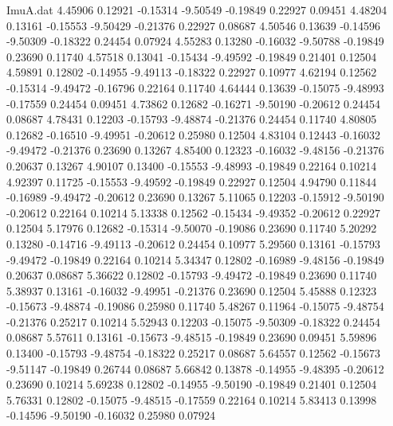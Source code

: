 \begin{filecontents}{ImuA.dat}
   4.45906    0.12921   -0.15314   -9.50549   -0.19849    0.22927    0.09451
   4.48204    0.13161   -0.15553   -9.50429   -0.21376    0.22927    0.08687
   4.50546    0.13639   -0.14596   -9.50309   -0.18322    0.24454    0.07924
   4.55283    0.13280   -0.16032   -9.50788   -0.19849    0.23690    0.11740
   4.57518    0.13041   -0.15434   -9.49592   -0.19849    0.21401    0.12504
   4.59891    0.12802   -0.14955   -9.49113   -0.18322    0.22927    0.10977
   4.62194    0.12562   -0.15314   -9.49472   -0.16796    0.22164    0.11740
   4.64444    0.13639   -0.15075   -9.48993   -0.17559    0.24454    0.09451
   4.73862    0.12682   -0.16271   -9.50190   -0.20612    0.24454    0.08687
   4.78431    0.12203   -0.15793   -9.48874   -0.21376    0.24454    0.11740
   4.80805    0.12682   -0.16510   -9.49951   -0.20612    0.25980    0.12504
   4.83104    0.12443   -0.16032   -9.49472   -0.21376    0.23690    0.13267
   4.85400    0.12323   -0.16032   -9.48156   -0.21376    0.20637    0.13267
   4.90107    0.13400   -0.15553   -9.48993   -0.19849    0.22164    0.10214
   4.92397    0.11725   -0.15553   -9.49592   -0.19849    0.22927    0.12504
   4.94790    0.11844   -0.16989   -9.49472   -0.20612    0.23690    0.13267
   5.11065    0.12203   -0.15912   -9.50190   -0.20612    0.22164    0.10214
   5.13338    0.12562   -0.15434   -9.49352   -0.20612    0.22927    0.12504
   5.17976    0.12682   -0.15314   -9.50070   -0.19086    0.23690    0.11740
   5.20292    0.13280   -0.14716   -9.49113   -0.20612    0.24454    0.10977
   5.29560    0.13161   -0.15793   -9.49472   -0.19849    0.22164    0.10214
   5.34347    0.12802   -0.16989   -9.48156   -0.19849    0.20637    0.08687
   5.36622    0.12802   -0.15793   -9.49472   -0.19849    0.23690    0.11740
   5.38937    0.13161   -0.16032   -9.49951   -0.21376    0.23690    0.12504
   5.45888    0.12323   -0.15673   -9.48874   -0.19086    0.25980    0.11740
   5.48267    0.11964   -0.15075   -9.48754   -0.21376    0.25217    0.10214
   5.52943    0.12203   -0.15075   -9.50309   -0.18322    0.24454    0.08687
   5.57611    0.13161   -0.15673   -9.48515   -0.19849    0.23690    0.09451
   5.59896    0.13400   -0.15793   -9.48754   -0.18322    0.25217    0.08687
   5.64557    0.12562   -0.15673   -9.51147   -0.19849    0.26744    0.08687
   5.66842    0.13878   -0.14955   -9.48395   -0.20612    0.23690    0.10214
   5.69238    0.12802   -0.14955   -9.50190   -0.19849    0.21401    0.12504
   5.76331    0.12802   -0.15075   -9.48515   -0.17559    0.22164    0.10214
   5.83413    0.13998   -0.14596   -9.50190   -0.16032    0.25980    0.07924

\end{filecontents}
